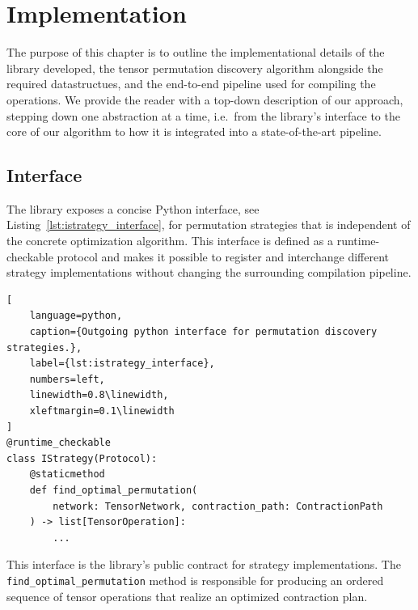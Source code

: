 
\chapter{Implementation}\label{chapter:implementation}

The purpose of this chapter is to outline the implementational details of the library developed, the tensor permutation discovery algorithm alongside the required datastructues, and the end-to-end pipeline used for compiling the operations. We provide the reader with a top-down description of our approach, stepping down one abstraction at a time, i.e.\ from the library's interface to the core of our algorithm to how it is integrated into a state-of-the-art pipeline.

\section{Interface}

The library exposes a concise Python interface, see Listing~\ref{lst:istrategy_interface}, for permutation strategies that is independent of the concrete optimization algorithm. This interface is defined as a runtime-checkable protocol and makes it possible to register and interchange different strategy implementations without changing the surrounding compilation pipeline.

\begin{center}
\begin{lstlisting}[
    language=python,
    caption={Outgoing python interface for permutation discovery strategies.},
    label={lst:istrategy_interface},
    numbers=left,
    linewidth=0.8\linewidth,
    xleftmargin=0.1\linewidth
]
@runtime_checkable
class IStrategy(Protocol):
    @staticmethod
    def find_optimal_permutation(
        network: TensorNetwork, contraction_path: ContractionPath
    ) -> list[TensorOperation]:
        ...
\end{lstlisting}
\end{center}


This interface is the library's public contract for strategy implementations. The \texttt{find\_optimal\_permutation} method is responsible for producing an ordered sequence of tensor operations that realize an optimized contraction plan.


